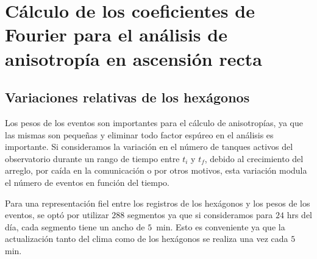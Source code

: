 
\section{Cálculo de los coeficientes de Fourier para el análisis de anisotropía en ascensión recta}

  \subsection{Variaciones relativas de los hexágonos} \label{peso_hexagonos}

    Los pesos de los eventos son importantes para el cálculo de anisotropías, ya que las mismas son pequeñas y eliminar todo factor espúreo en el análisis es importante.  Si consideramos la variación en el número de tanques activos del observatorio durante un rango de tiempo entre $t_{i}$ y $t_f$, debido al crecimiento del arreglo, por caída en la comunicación o por otros motivos, esta variación modula el número de  eventos en función del tiempo.

    Para una representación fiel entre los registros de los hexágonos y los pesos de los eventos, se optó por utilizar $288$ segmentos ya que si consideramos para $24$ hrs del día, cada segmento tiene un ancho de $5$\, min. Esto es conveniente ya que la actualización tanto del clima como de los hexágonos se realiza una vez cada $5$\,min.

